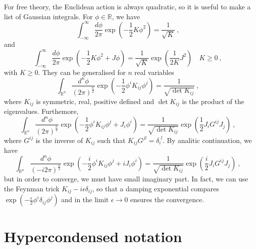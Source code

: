     For free theory, the Euclidean action is always quadratic, so it is useful to make a list of Gaussian integrals. For $\phi \in \mathbb R$, we have
    \begin{equation*}
        \int_{-\infty}^\infty \frac{d\phi}{2\pi} \exp(- \frac{1}{2} K \phi^2) = \frac{1}{\sqrt{K}} ~,
    \end{equation*}
    and
    \begin{equation*}
        \int_{-\infty}^\infty \frac{d\phi}{2\pi} \exp(- \frac{1}{2} K \phi^2 + J \phi) = \frac{1}{\sqrt{K}} \exp(\frac{1}{2K} J^2) \quad K \geq 0 ~,
    \end{equation*}
    with $K \geq 0$.
    They can be generalised for $n$ real variables
    \begin{equation*}
        \int_{\mathbb R^n} \frac{d^n \phi}{(2\pi)^{\frac{n}{2}}} \exp(- \frac{1}{2} \phi^i K_{ij} \phi^j ) = \frac{1}{\sqrt{\det K_{ij}}} ~,
    \end{equation*}
    where $K_{ij}$ is symmetric, real, positive defined and $\det K_{ij}$ is the product of the eigenvalues. Furthemore,
    \begin{equation*}
        \int_{\mathbb R^n} \frac{d^n \phi}{(2\pi)^{\frac{n}{2}}} \exp(- \frac{1}{2} \phi^i K_{ij} \phi^j + J_i \phi^i) = \frac{1}{\sqrt{\det K_{ij}}} \exp( \frac{1}{2} J_i G^{ij} J_j ) ~,
    \end{equation*}
    where $G^{ij}$ is the inverse of $K_{ij}$ such that $K_{ij}G^{jl} = \delta_i^{\phantom i l}$.
    By analitic continuation, we have 
    \begin{equation*}
        \int_{\mathbb R^n} \frac{d^n \phi}{(-i2\pi)^{\frac{n}{2}}} \exp(- \frac{i}{2} \phi^i K_{ij} \phi^j + i J_i \phi^i) = \frac{1}{\sqrt{\det K_{ij}}} \exp( \frac{i}{2} J_i G^{ij} J_j ) ~,
    \end{equation*}
    but in order to converge, we must have small imaginary part. In fact, we can use the Feynman trick $K_{ij} - i \epsilon \delta_{ij}$, so that a damping exponential compares $\exp(- \frac{\epsilon}{2} \phi^i \delta_{ij} \phi^j)$ and in the limit $\epsilon \rightarrow 0$ ensures the convergence.

\section{Hypercondensed notation}

